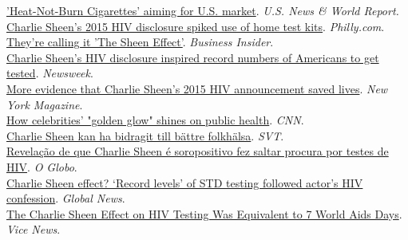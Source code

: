 \documentclass[10pt, letterpaper]{article}
\begin{document}
\href{https://health.usnews.com/health-care/articles/2017-10-11/heat-not-burn-cigarettes-aiming-for-us-market}{'Heat-Not-Burn Cigarettes' aiming for U.S. market}. \emph{U.S. News \& World Report.} \\[.2cm]
\href{http://www.philly.com/philly/health/topics/HealthDay722712_20170518_Charlie_Sheen_s_2015_HIV_Disclosure_Spiked_Use_of_Home_Test_Kits.html}{Charlie Sheen's 2015 HIV disclosure spiked use of home test kits}. \emph{Philly.com}.\\[.2cm]
\href{http://www.businessinsider.com/charlie-sheen-effect-hiv-test-home-2017-5}{They're calling it 'The Sheen Effect'}. \emph{Business Insider}.\\[.2cm]
\href{http://www.newsweek.com/charlie-sheens-hiv-disclosure-inspired-record-numbers-americans-get-tested-611756}{Charlie Sheen's HIV disclosure inspired record numbers of Americans to get tested}. \emph{Newsweek}.\\[.2cm]
\href{http://nymag.com/scienceofus/2017/05/more-evidence-charlie-sheens-hiv-announcement-saved-lives.html}{More evidence that Charlie Sheen’s 2015 HIV announcement saved lives}. \emph{New York Magazine}.\\[.2cm]
\href{http://www.cnn.com/2017/05/18/health/celebrity-health-charlie-sheen-study/}{How celebrities' "golden glow" shines on public health}. \emph{CNN}.\\[.2cm]
\href{https://www.svt.se/nyheter/vetenskap/charlie-sheen-kan-ha-bidragit-till-battre-folkhalsa}{Charlie Sheen kan ha bidragit till bättre folkhälsa}. \emph{SVT}.\\[.2cm]
\href{https://oglobo.globo.com/sociedade/saude/revelacao-de-que-charlie-sheen-soropositivo-fez-saltar-procura-por-testes-de-hiv-21353810}{Revelação de que Charlie Sheen é soropositivo fez saltar procura por testes de HIV}. \emph{O Globo}.\\[.2cm]
\href{http://globalnews.ca/news/3459155/charlie-sheen-effect-record-levels-of-std-testing-followed-actors-hiv-positive-confession/}{Charlie Sheen effect? ‘Record levels’ of STD testing followed actor’s HIV confession}. \emph{Global News}.\\[.2cm]
\href{https://tonic.vice.com/en_us/article/the-charlie-sheen-effect-on-hiv-testing-was-equivalent-to-7-world-aids-days}{The Charlie Sheen Effect on HIV Testing Was Equivalent to 7 World Aids Days}. \emph{Vice News}.\\[.2cm]
\end{document}
